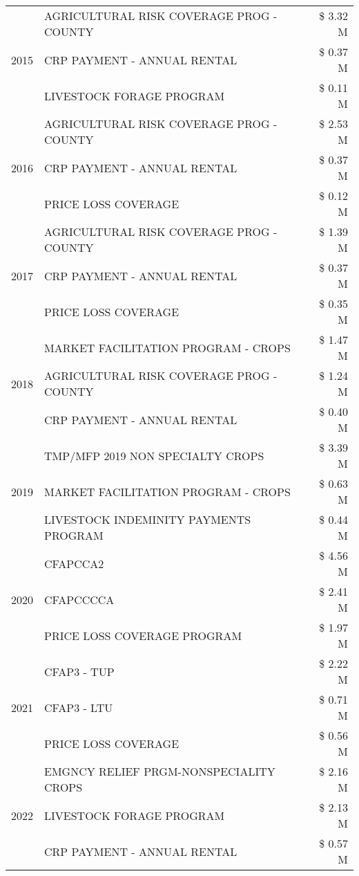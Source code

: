 \begin{tabular}{llr}
\multirow[t]{3}{*}{2015} & AGRICULTURAL RISK COVERAGE PROG - COUNTY & \$ 3.32 M \\
 & CRP PAYMENT - ANNUAL RENTAL & \$ 0.37 M \\
 & LIVESTOCK FORAGE PROGRAM & \$ 0.11 M \\
\cline{1-3}
\multirow[t]{3}{*}{2016} & AGRICULTURAL RISK COVERAGE PROG - COUNTY & \$ 2.53 M \\
 & CRP PAYMENT - ANNUAL RENTAL & \$ 0.37 M \\
 & PRICE LOSS COVERAGE & \$ 0.12 M \\
\cline{1-3}
\multirow[t]{3}{*}{2017} & AGRICULTURAL RISK COVERAGE PROG - COUNTY & \$ 1.39 M \\
 & CRP PAYMENT - ANNUAL RENTAL & \$ 0.37 M \\
 & PRICE LOSS COVERAGE & \$ 0.35 M \\
\cline{1-3}
\multirow[t]{3}{*}{2018} & MARKET FACILITATION PROGRAM - CROPS & \$ 1.47 M \\
 & AGRICULTURAL RISK COVERAGE PROG - COUNTY & \$ 1.24 M \\
 & CRP PAYMENT - ANNUAL RENTAL & \$ 0.40 M \\
\cline{1-3}
\multirow[t]{3}{*}{2019} & TMP/MFP 2019 NON SPECIALTY CROPS & \$ 3.39 M \\
 & MARKET FACILITATION PROGRAM - CROPS & \$ 0.63 M \\
 & LIVESTOCK INDEMINITY PAYMENTS PROGRAM & \$ 0.44 M \\
\cline{1-3}
\multirow[t]{3}{*}{2020} & CFAPCCA2 & \$ 4.56 M \\
 & CFAPCCCCA & \$ 2.41 M \\
 & PRICE LOSS COVERAGE PROGRAM & \$ 1.97 M \\
\cline{1-3}
\multirow[t]{3}{*}{2021} & CFAP3 - TUP & \$ 2.22 M \\
 & CFAP3 - LTU & \$ 0.71 M \\
 & PRICE LOSS COVERAGE & \$ 0.56 M \\
\cline{1-3}
\multirow[t]{3}{*}{2022} & EMGNCY RELIEF PRGM-NONSPECIALITY CROPS & \$ 2.16 M \\
 & LIVESTOCK FORAGE PROGRAM & \$ 2.13 M \\
 & CRP PAYMENT - ANNUAL RENTAL & \$ 0.57 M \\
\cline{1-3}
\bottomrule
\end{tabular}

